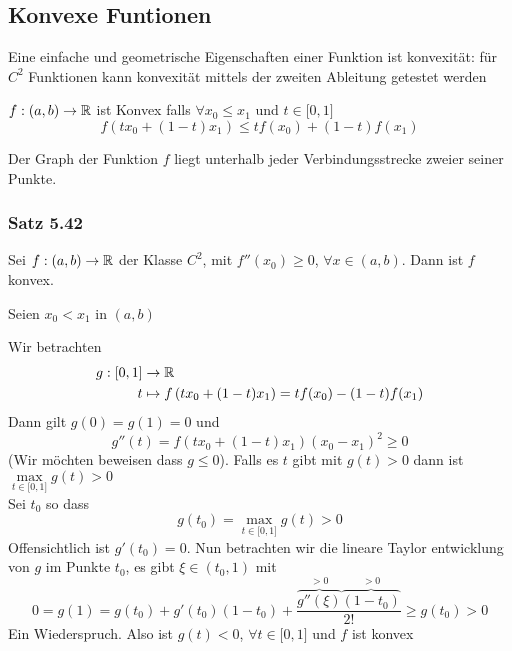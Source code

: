 \subsection*{Konvexe Funtionen}
Eine einfache und geometrische Eigenschaften einer Funktion ist konvexität: für $C^2$ Funktionen kann konvexität mittels der zweiten Ableitung getestet werden

\begin{definition}{5.41}
$f:(a,b)\to\mathbb{R}$ ist Konvex falls $\forall x_0\leq x_1$ und $t\in\lbrack 0,1\rbrack$
\[f\left( tx_0+(1-t)x_1\right)\leq tf(x_0)+(1-t)f(x_1)\]
\end{definition}

Der Graph der Funktion $f$ liegt unterhalb jeder Verbindungsstrecke zweier seiner Punkte. 

\subsubsection*{Satz 5.42}
Sei $f:(a,b)\to\mathbb{R}$ der Klasse $C^2$, mit $f''(x_0)\geq 0$, $\forall x\in (a,b)$. Dann ist $f$ konvex.

\begin{beweis}{}
Seien $x_0<x_1$ in $(a,b)$
\begin{center}
\end{center}
Wir betrachten 
\begin{align*}
g:\lbrack 0,1\rbrack&\to\mathbb{R}\\
t&\mapsto f\left( tx_0+(1-t)x_1\right) = tf(x_0)-(1-t)f(x_1)
\end{align*}
Dann gilt $g(0)=g(1)=0$ und 
\[g''(t)=f\left( tx_0+(1-t)x_1\right)(x_0-x_1)^2\geq 0\]
(Wir möchten beweisen dass $g\leq 0$). Falls es $t$ gibt mit $g(t)>0$ dann ist $\max\limits_{t\in\lbrack 0,1\rbrack} g(t)>0$\\

\noindent Sei $t_0$ so dass 
\[g(t_0)=\max\limits_{t\in\lbrack 0,1\rbrack} g(t)>0\]
Offensichtlich ist $g'(t_0)=0$. Nun betrachten wir die lineare Taylor entwicklung von $g$ im Punkte $t_0$, es gibt $\xi\in(t_0,1)$ mit 
\[0=g(1)=g(t_0)+g'(t_0)(1-t_0)+\frac{{\overbrace {g''(\xi )}^{ > 0}\overbrace {(1 - {t_0})}^{ > 0}}}{{2!}}\geq g(t_0)>0\]
Ein Wiederspruch. Also ist $g(t)<0$, $\forall t\in\lbrack 0,1\rbrack$ und $f$ ist konvex
\end{beweis}

